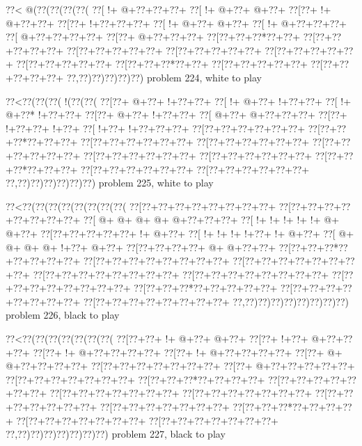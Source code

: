 \vbox{\vbox{\goo
\0??<\- @(\0??(\0??(\0??(\0??(
\0??[\- !+\- @+\0??+\0??+\0??+
\0??[\- !+\- @+\0??+\- @+\0??+
\0??[\0??+\- !+\- @+\0??+\0??+
\0??[\0??+\- !+\0??+\0??+\0??+
\0??[\- !+\- @+\0??+\- @+\0??+
\0??[\- !+\- @+\0??+\0??+\0??+
\0??[\- @+\0??+\0??+\0??+\0??+
\0??[\0??+\- @+\0??+\0??+\0??+
\0??[\0??+\0??+\0??*\0??+\0??+
\0??[\0??+\0??+\0??+\0??+\0??+
\0??[\0??+\0??+\0??+\0??+\0??+
\0??[\0??+\0??+\0??+\0??+\0??+
\0??[\0??+\0??+\0??+\0??+\0??+
\0??[\0??+\0??+\0??+\0??+\0??+
\0??[\0??+\0??+\0??*\0??+\0??+
\0??[\0??+\0??+\0??+\0??+\0??+
\0??[\0??+\0??+\0??+\0??+\0??+
\0??,\0??)\0??)\0??)\0??)\0??)
}
\hfil problem 224, white to play\hfil\break
}

\vbox{\vbox{\goo
\0??<\0??(\0??(\0??(\- !(\0??(\0??(
\0??[\0??+\- @+\0??+\- !+\0??+\0??+
\0??[\- !+\- @+\0??+\- !+\0??+\0??+
\0??[\- !+\- @+\0??*\- !+\0??+\0??+
\0??[\0??+\- @+\0??+\- !+\0??+\0??+
\0??[\- @+\0??+\- @+\0??+\0??+\0??+
\0??[\0??+\- !+\0??+\0??+\- !+\0??+
\0??[\- !+\0??+\- !+\0??+\0??+\0??+
\0??[\0??+\0??+\0??+\0??+\0??+\0??+
\0??[\0??+\0??+\0??*\0??+\0??+\0??+
\0??[\0??+\0??+\0??+\0??+\0??+\0??+
\0??[\0??+\0??+\0??+\0??+\0??+\0??+
\0??[\0??+\0??+\0??+\0??+\0??+\0??+
\0??[\0??+\0??+\0??+\0??+\0??+\0??+
\0??[\0??+\0??+\0??+\0??+\0??+\0??+
\0??[\0??+\0??+\0??*\0??+\0??+\0??+
\0??[\0??+\0??+\0??+\0??+\0??+\0??+
\0??[\0??+\0??+\0??+\0??+\0??+\0??+
\0??,\0??)\0??)\0??)\0??)\0??)\0??)
}
\hfil problem 225, white to play\hfil\break
}

\vbox{\vbox{\goo
\0??<\0??(\0??(\0??(\0??(\0??(\0??(\0??(\0??(
\0??[\0??+\0??+\0??+\0??+\0??+\0??+\0??+\0??+
\0??[\0??+\0??+\0??+\0??+\0??+\0??+\0??+\0??+
\0??[\- @+\- @+\- @+\- @+\- @+\0??+\0??+\0??+
\0??[\- !+\- !+\- !+\- !+\- !+\- @+\- @+\0??+
\0??[\0??+\0??+\0??+\0??+\0??+\- !+\- @+\0??+
\0??[\- !+\- !+\- !+\- !+\0??+\- !+\- @+\0??+
\0??[\- @+\- @+\- @+\- @+\- !+\0??+\- @+\0??+
\0??[\0??+\0??+\0??+\0??+\- @+\- @+\0??+\0??+
\0??[\0??+\0??+\0??*\0??+\0??+\0??+\0??+\0??+
\0??[\0??+\0??+\0??+\0??+\0??+\0??+\0??+\0??+
\0??[\0??+\0??+\0??+\0??+\0??+\0??+\0??+\0??+
\0??[\0??+\0??+\0??+\0??+\0??+\0??+\0??+\0??+
\0??[\0??+\0??+\0??+\0??+\0??+\0??+\0??+\0??+
\0??[\0??+\0??+\0??+\0??+\0??+\0??+\0??+\0??+
\0??[\0??+\0??+\0??*\0??+\0??+\0??+\0??+\0??+
\0??[\0??+\0??+\0??+\0??+\0??+\0??+\0??+\0??+
\0??[\0??+\0??+\0??+\0??+\0??+\0??+\0??+\0??+
\0??,\0??)\0??)\0??)\0??)\0??)\0??)\0??)\0??)
}
\hfil problem 226, black to play\hfil\break
}

\vbox{\vbox{\goo
\0??<\0??(\0??(\0??(\0??(\0??(\0??(\0??(
\0??[\0??+\0??+\- !+\- @+\0??+\- @+\0??+
\0??[\0??+\- !+\0??+\- @+\0??+\0??+\0??+
\0??[\0??+\- !+\- @+\0??+\0??+\0??+\0??+
\0??[\0??+\- !+\- @+\0??+\0??+\0??+\0??+
\0??[\0??+\- @+\- @+\0??+\0??+\0??+\0??+
\0??[\0??+\0??+\0??+\0??+\0??+\0??+\0??+
\0??[\0??+\- @+\0??+\0??+\0??+\0??+\0??+
\0??[\0??+\0??+\0??+\0??+\0??+\0??+\0??+
\0??[\0??+\0??+\0??*\0??+\0??+\0??+\0??+
\0??[\0??+\0??+\0??+\0??+\0??+\0??+\0??+
\0??[\0??+\0??+\0??+\0??+\0??+\0??+\0??+
\0??[\0??+\0??+\0??+\0??+\0??+\0??+\0??+
\0??[\0??+\0??+\0??+\0??+\0??+\0??+\0??+
\0??[\0??+\0??+\0??+\0??+\0??+\0??+\0??+
\0??[\0??+\0??+\0??*\0??+\0??+\0??+\0??+
\0??[\0??+\0??+\0??+\0??+\0??+\0??+\0??+
\0??[\0??+\0??+\0??+\0??+\0??+\0??+\0??+
\0??,\0??)\0??)\0??)\0??)\0??)\0??)\0??)
}
\hfil problem 227, black to play\hfil\break
}

